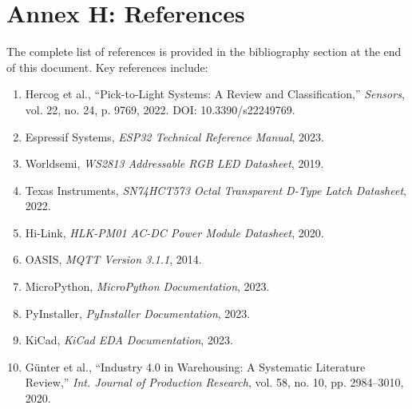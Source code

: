 \section{Annex H: References}
\label{annex:references}

The complete list of references is provided in the bibliography section at the end of this document. Key references include:

\begin{enumerate}
  \item Hercog et al., ``Pick-to-Light Systems: A Review and Classification,'' \textit{Sensors}, vol. 22, no. 24, p. 9769, 2022. DOI: 10.3390/s22249769.
  \item Espressif Systems, \textit{ESP32 Technical Reference Manual}, 2023.
  \item Worldsemi, \textit{WS2813 Addressable RGB LED Datasheet}, 2019.
  \item Texas Instruments, \textit{SN74HCT573 Octal Transparent D-Type Latch Datasheet}, 2022.
  \item Hi-Link, \textit{HLK-PM01 AC-DC Power Module Datasheet}, 2020.
  \item OASIS, \textit{MQTT Version 3.1.1}, 2014.
  \item MicroPython, \textit{MicroPython Documentation}, 2023.
  \item PyInstaller, \textit{PyInstaller Documentation}, 2023.
  \item KiCad, \textit{KiCad EDA Documentation}, 2023.
  \item G\"unter et al., ``Industry 4.0 in Warehousing: A Systematic Literature Review,'' \textit{Int. Journal of Production Research}, vol. 58, no. 10, pp. 2984--3010, 2020.
\end{enumerate}
